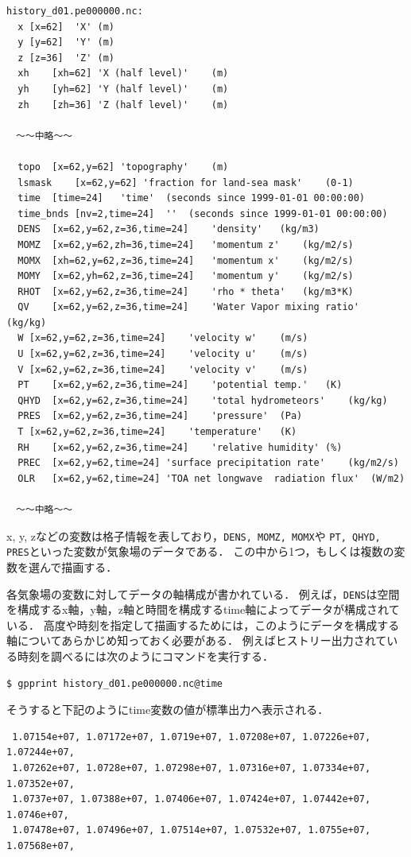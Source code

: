 {\small \begin{verbatim}
history_d01.pe000000.nc:
  x	[x=62]	'X'	(m)
  y	[y=62]	'Y'	(m)
  z	[z=36]	'Z'	(m)
  xh	[xh=62]	'X (half level)'	(m)
  yh	[yh=62]	'Y (half level)'	(m)
  zh	[zh=36]	'Z (half level)'	(m)

　～～中略～～

  topo	[x=62,y=62]	'topography'	(m)
  lsmask	[x=62,y=62]	'fraction for land-sea mask'	(0-1)
  time	[time=24]	'time'	(seconds since 1999-01-01 00:00:00)
  time_bnds	[nv=2,time=24]	''	(seconds since 1999-01-01 00:00:00)
  DENS	[x=62,y=62,z=36,time=24]	'density'	(kg/m3)
  MOMZ	[x=62,y=62,zh=36,time=24]	'momentum z'	(kg/m2/s)
  MOMX	[xh=62,y=62,z=36,time=24]	'momentum x'	(kg/m2/s)
  MOMY	[x=62,yh=62,z=36,time=24]	'momentum y'	(kg/m2/s)
  RHOT	[x=62,y=62,z=36,time=24]	'rho * theta'	(kg/m3*K)
  QV	[x=62,y=62,z=36,time=24]	'Water Vapor mixing ratio'	(kg/kg)
  W	[x=62,y=62,z=36,time=24]	'velocity w'	(m/s)
  U	[x=62,y=62,z=36,time=24]	'velocity u'	(m/s)
  V	[x=62,y=62,z=36,time=24]	'velocity v'	(m/s)
  PT	[x=62,y=62,z=36,time=24]	'potential temp.'	(K)
  QHYD	[x=62,y=62,z=36,time=24]	'total hydrometeors'	(kg/kg)
  PRES	[x=62,y=62,z=36,time=24]	'pressure'	(Pa)
  T	[x=62,y=62,z=36,time=24]	'temperature'	(K)
  RH	[x=62,y=62,z=36,time=24]	'relative humidity'	(%)
  PREC	[x=62,y=62,time=24]	'surface precipitation rate'	(kg/m2/s)
  OLR	[x=62,y=62,time=24]	'TOA net longwave  radiation flux'	(W/m2)

　～～中略～～
\end{verbatim} }

x, y, zなどの変数は格子情報を表しており，\verb|DENS, MOMZ, MOMX|や
\verb|PT, QHYD, PRES|といった変数が気象場のデータである．
この中から1つ，もしくは複数の変数を選んで描画する．

各気象場の変数に対してデータの軸構成が書かれている．
例えば，\verb|DENS|は空間を構成するx軸，y軸，z軸と時間を構成するtime軸によってデータが構成されている．
高度や時刻を指定して描画するためには，このようにデータを構成する軸についてあらかじめ知っておく必要がある．
例えばヒストリー出力されている時刻を調べるには次のようにコマンドを実行する．

\begin{verbatim}
$ gpprint history_d01.pe000000.nc@time
\end{verbatim}

そうすると下記のようにtime変数の値が標準出力へ表示される．

\begin{verbatim}
 1.07154e+07, 1.07172e+07, 1.0719e+07, 1.07208e+07, 1.07226e+07, 1.07244e+07,
 1.07262e+07, 1.0728e+07, 1.07298e+07, 1.07316e+07, 1.07334e+07, 1.07352e+07,
 1.0737e+07, 1.07388e+07, 1.07406e+07, 1.07424e+07, 1.07442e+07, 1.0746e+07,
 1.07478e+07, 1.07496e+07, 1.07514e+07, 1.07532e+07, 1.0755e+07, 1.07568e+07,
\end{verbatim}

